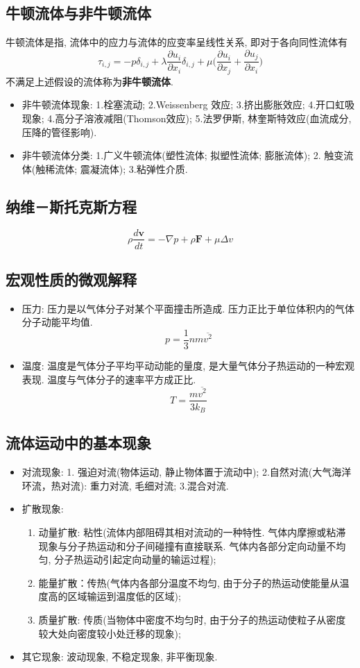 \documentclass[a4paper,titlepage,twocolumn]{article}
\begin{document}
\subsection{牛顿流体与非牛顿流体}
牛顿流体是指, 流体中的应力与流体的应变率呈线性关系, 即对于各向同性流体有
\[
\tau_{i,j} = -p\delta_{i,j}+\lambda\frac{\partial u_i}{\partial x_i}\delta_{i,j} +\mu\bigg(\frac{\partial u_i}{\partial x_j} + \frac{\partial u_j}{\partial x_i}\bigg)
\]
不满足上述假设的流体称为\textbf{非牛顿流体}. 
\begin{itemize}
\item 非牛顿流体现象: 1.栓塞流动; 2.Weissenberg 效应; 3.挤出膨胀效应; 4.开口虹吸现象; 4.高分子溶液减阻(Thomson效应); 5.法罗伊斯, 林奎斯特效应(血流成分, 压降的管径影响).
\item 非牛顿流体分类: 1.广义牛顿流体(塑性流体; 拟塑性流体; 膨胀流体); 2. 触变流体(触稀流体; 震凝流体); 3.粘弹性介质.
\end{itemize}

\subsection{纳维－斯托克斯方程}
\[
\rho \frac{d\mathbf{v}}{dt}=-\nabla p + \rho\mathbf{F}+\mu\Delta v
\]
\subsection{宏观性质的微观解释}
\begin{itemize}
\item 压力: 压力是以气体分子对某个平面撞击所造成. 压力正比于单位体积内的气体分子动能平均值.
\[
p = \frac{1}{3}n m \overline{v^2}
\]

\item 温度: 温度是气体分子平均平动动能的量度, 是大量气体分子热运动的一种宏观表现. 温度与气体分子的速率平方成正比.
\[
T = \frac{m\overline{v^2}}{3k_B}
\]
\end{itemize}


\subsection{流体运动中的基本现象}
\begin{itemize}
\item 对流现象: 1. 强迫对流(物体运动, 静止物体置于流动中); 2.自然对流(大气海洋环流，热对流): 重力对流, 毛细对流; 3.混合对流.
\item 扩散现象: 
\begin{enumerate}
\item 动量扩散: 粘性(流体内部阻碍其相对流动的一种特性. 气体内摩擦或粘滞现象与分子热运动和分子间碰撞有直接联系. 气体内各部分定向动量不均匀, 分子热运动引起定向动量的输运过程);
\item 能量扩散：传热(气体内各部分温度不均匀, 由于分子的热运动使能量从温度高的区域输运到温度低的区域);
\item 质量扩散: 传质(当物体中密度不均匀时, 由于分子的热运动使粒子从密度较大处向密度较小处迁移的现象);
\end{enumerate}
\item 其它现象: 波动现象, 不稳定现象, 非平衡现象.
\end{itemize}
\end{document}

